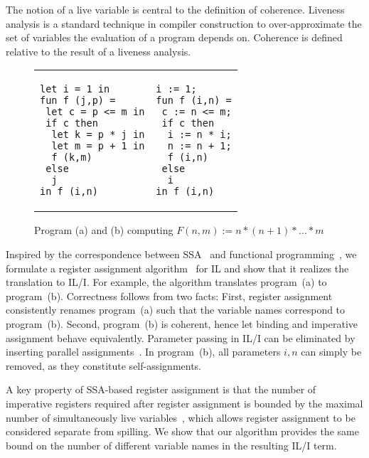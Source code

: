 \documentclass[openright,a4paper,11pt]{scrartcl}
\theoremstyle{plain}
\theoremstyle{plain}
\theoremstyle{plain}
\theoremstyle{plain}
\theoremstyle{nonumberplain}
\begin{document}
The notion of a live variable is central to the definition of coherence.
Liveness analysis is a standard technique in compiler construction to over-approximate the set of variables the evaluation of a program depends on.
Coherence is defined relative to the result of a liveness analysis.

\begin{figure}[h]
\begin{tabular}{p{}p{}}
\begin{lstlisting}[caption={},belowskip=-\baselineskip,aboveskip={-0.8\baselineskip}]
let i = 1 in
fun f (j,p) =
 let c = p <= m in
 if c then
  let k = p * j in
  let m = p + 1 in
  f (k,m)
 else
  j
in f (i,n)
\end{lstlisting}
&
\begin{lstlisting}[caption={},belowskip=-\baselineskip,aboveskip={-0.8\baselineskip}]
i := 1;
fun f (i,n) =
 c := n <= m;
 if c then
  i := n * i;
  n := n + 1;
  f (i,n)
 else
  i
in f (i,n)
\end{lstlisting}
\end{tabular}
\caption{Program (a) and (b) computing $ F(n,m) := n * (n+1) * \ldots * m $}
\label{fourprog}
\end{figure}

Inspired by the correspondence between SSA~\cite{DBLP:journals/toplas/CytronFRWZ91}
and functional programming~\cite{Kelsey:1995, DBLP:journals/sigplan/Appel98}, we formulate a register assignment algorithm~\cite{DBLP:conf/cc/HackGG06} for IL and show that it realizes the translation to IL/I.
For example, the algorithm translates program~(a) to program~(b).
Correctness follows from two facts:
First, register assignment consistently renames program~(a) such that the variable names correspond to program~(b).
Second, program~(b) is coherent, hence let binding and imperative assignment behave equivalently.
Parameter passing in IL/I can be eliminated by inserting parallel assignments~\cite{DBLP:conf/cc/HackGG06}.
In program~(b), all parameters $i,n$ can simply be removed, as they constitute self-assignments.

A key property of SSA-based register assignment is that the number of imperative registers required after register assignment is bounded by the maximal number of simultaneously live variables~\cite{DBLP:conf/cc/HackGG06}, which allows register assignment to be considered separate from spilling.
We show that our algorithm provides the same bound on the number of different variable names in the resulting IL/I term.
\end{document}
